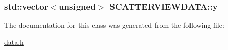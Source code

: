 \hypertarget{class_s_c_a_t_t_e_r_v_i_e_w_d_a_t_a_fef898485048afd11c4f1d4ceff274af}{
\subsubsection[{y}]{\setlength{\rightskip}{0pt plus 5cm}std::vector$<$unsigned$>$ {\bf SCATTERVIEWDATA::y}}}
\label{class_s_c_a_t_t_e_r_v_i_e_w_d_a_t_a_fef898485048afd11c4f1d4ceff274af}




The documentation for this class was generated from the following file:\begin{CompactItemize}
\item 
\hyperlink{data_8h}{data.h}\end{CompactItemize}
